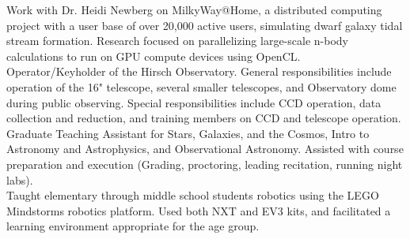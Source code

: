 \documentclass[letterpaper]{deedy-resume} %
\begin{document}
\begin{minipage}[t]{0.66\textwidth}
Work with Dr. Heidi Newberg on MilkyWay@Home, a distributed computing
project with a user base of over 20,000 active users, simulating dwarf galaxy tidal
stream formation. Research focused on parallelizing large-scale n-body calculations
to run on GPU compute devices using OpenCL.
\vspace{3pt}\\
Operator/Keyholder of the Hirsch Observatory. General responsibilities include operation of the 16" telescope, several smaller telescopes, and Observatory dome during public observing. Special responsibilities include CCD operation, data collection and reduction, and training members on CCD and telescope operation.
\vspace{3pt}\\
Graduate Teaching Assistant for Stars, Galaxies, and the Cosmos, Intro to Astronomy and Astrophysics, and Observational Astronomy. Assisted with course
preparation and execution (Grading, proctoring, leading recitation, running night labs).
\vspace{3pt}\\
\vspace{3pt}
Taught elementary through middle school students robotics using the LEGO
Mindstorms robotics platform. Used both NXT and EV3 kits, and facilitated a learning
environment appropriate for the age group.
\vspace{3pt}\\
\vspace{3pt}





\end{minipage}
\end{document}
